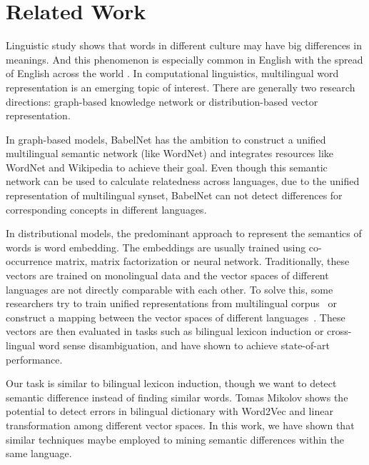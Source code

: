 \section{Related Work}
Linguistic study \cite{kovecses2006language} shows that words in different culture may have big differences in meanings. And this phenomenon is especially common in English with the spread of English across the world \cite{lipka1990outline,wierzbicka2006english,jackson2007words}.  In computational linguistics, 
multilingual word representation is an emerging topic of interest. 
There are generally two research directions: graph-based knowledge network or distribution-based vector representation. 

In graph-based models, BabelNet\cite{Navigli:2012dn} has the ambition 
to construct a unified multilingual semantic network (like WordNet) and 
integrates resources like WordNet and Wikipedia to achieve their goal. 
Even though this semantic network can be used to calculate relatedness 
across languages, due to the unified representation of multilingual synset, 
BabelNet can not detect differences for corresponding concepts 
in different languages.

In distributional models, the predominant approach to represent the
semantics of words is word embedding. The embeddings are usually trained 
using co-occurrence matrix, 
matrix factorization\cite{lebret2013word,levy2014neural,li2015word} or 
neural network\cite{Mikolov2013distributed}. 
Traditionally, these vectors are trained on monolingual data and 
the vector spaces of different languages are not directly comparable 
with each other. To solve this, some researchers try to train 
unified representations from multilingual 
corpus~\cite{Klementiev:2012uk,hermann2014multilingual,Vulic:2015to} 
or construct a mapping between the vector spaces of 
different languages~\cite{Mikolov:2013tp}. These vectors are then evaluated 
in tasks such as bilingual lexicon induction or cross-lingual 
word sense disambiguation, and have shown to achieve state-of-art performance.

Our task is similar to bilingual lexicon induction, though we want to 
detect semantic difference instead of finding similar words. 
Tomas Mikolov\cite{Mikolov:2013tp} shows the potential to detect errors 
in bilingual dictionary with Word2Vec and linear transformation among 
different vector spaces. In this work, we have shown that similar techniques
maybe employed to mining semantic differences within the same language.

